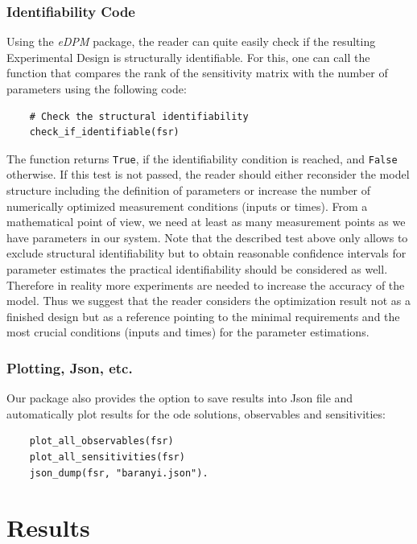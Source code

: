 \documentclass[graybox]{svmult}
\begin{document}
\subsubsection*{Identifiability Code}
Using the {\it eDPM} package, the reader can quite easily check if the resulting Experimental Design is structurally identifiable.
For this, one can call the function that compares the rank of the sensitivity matrix with the number of parameters using the following code:
\begin{verbatim}
    # Check the structural identifiability
    check_if_identifiable(fsr)
\end{verbatim}
The function returns \texttt{True}, if the identifiability condition is reached, and \texttt{False} otherwise.
If this test is not passed, the reader should either reconsider the model structure including the definition of parameters or increase the number of numerically optimized measurement conditions (inputs or times).
From a mathematical point of view, we need at least as many measurement points as we have parameters in our system.
Note that the described test above only allows to exclude structural identifiability but to obtain reasonable confidence intervals for parameter estimates the practical identifiability should be considered as well.
Therefore in reality more experiments are needed to increase the accuracy of the model.
Thus we suggest that the reader considers the optimization result not as a finished design but as a reference pointing to the minimal requirements and the most crucial conditions (inputs and times) for the parameter estimations.
%
\subsubsection*{Plotting, Json, etc.}
Our package also provides the option to save results into Json file and automatically plot results for the ode solutions, observables and sensitivities:
\begin{verbatim}
    plot_all_observables(fsr)
    plot_all_sensitivities(fsr)
    json_dump(fsr, "baranyi.json").
\end{verbatim}
%
%
%
\section*{Results}
\end{document}
